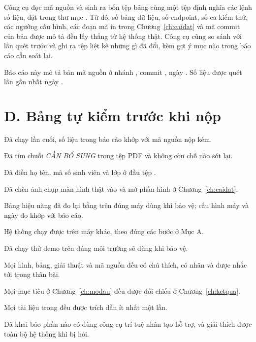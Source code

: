 Công cụ đọc mã nguồn và sinh ra bốn tệp bảng cùng một tệp định nghĩa các lệnh
số liệu, đặt trong thư mục . Từ đó, số bảng dữ liệu, số
endpoint, số ca kiểm thử, các ngưỡng cấu hình, các đoạn mã in trong
Chương~\ref{ch:caidat} và mã commit của bản được mô tả đều lấy thẳng từ hệ
thống thật. Công cụ cũng so sánh với lần quét trước và ghi ra tệp
 liệt kê những gì đã đổi, kèm gợi ý mục nào trong báo
cáo cần soát lại.

\begin{ghinho}
Báo cáo này mô tả bản mã nguồn ở nhánh \code{\FnhanhGit}, commit
\code{\FcommitCuoi}, ngày \FngayCommit. Số liệu được quét lần gần nhất ngày
\FngayQuet.
\end{ghinho}

\section*{D. Bảng tự kiểm trước khi nộp}
{}

\begin{tukiem}
  \item Đã chạy  lần cuối, số liệu
        trong báo cáo khớp với mã nguồn nộp kèm.
  \item Đã tìm chuỗi \emph{CẦN BỔ SUNG} trong tệp PDF và không còn chỗ nào
        sót lại.
  \item Đã điền họ tên, mã số sinh viên và lớp ở đầu tệp .
  \item Đã chèn ảnh chụp màn hình thật vào  và mở phần hình ở
        Chương~\ref{ch:caidat}.
  \item Bảng hiệu năng đã đo lại bằng  trên
        đúng máy dùng khi bảo vệ; cấu hình máy và ngày đo khớp với báo cáo.
  \item Hệ thống chạy được trên máy khác, theo đúng các bước ở Mục A.
  \item Đã chạy thử demo trên đúng môi trường sẽ dùng khi bảo vệ.
  \item Mọi hình, bảng, giải thuật và mã nguồn đều có chú thích, có nhãn và
        được nhắc tới trong thân bài.
  \item Mọi mục tiêu ở Chương~\ref{ch:modau} đều được đối chiếu ở
        Chương~\ref{ch:ketqua}.
  \item Mọi tài liệu trong  đều được trích dẫn ít nhất một lần.
  \item Đã khai báo phần nào có dùng công cụ trí tuệ nhân tạo hỗ trợ, và giải
        thích được toàn bộ hệ thống khi bị hỏi.
\end{tukiem}

